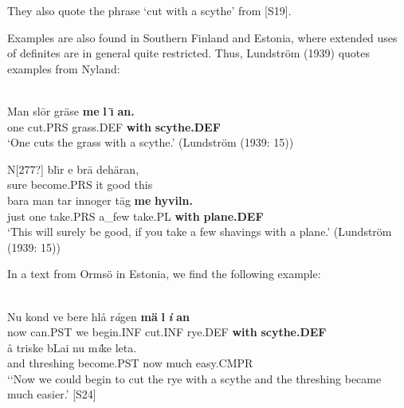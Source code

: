 They also quote the phrase  ‘cut with a scythe’ from [S19]. 


Examples are also found in Southern Finland and Estonia, where extended uses of definites are in general quite restricted. Thus, Lundström (1939) quotes examples from Nyland:


\ea\label{}
\\
\gll Man  sl\=or  gräse  \textbf{me} \textbf{l} \textbf{\={\i}} \textbf{an.}\\
one  cut.PRS  grass.DEF  \textbf{with} \textbf{scythe.DEF}\\
\glt ‘One cuts the grass with a scythe.’ (Lundström (1939: 15))

\z

\ea
\gll N[277?]  bl\={\i}r  e  br\=a  dehäran,\\
sure  become.PRS  it  good  this\\
\gll bara  man  tar  innoger  t\=ag  \textbf{me} \textbf{hyviln.}\\
just  one  take.PRS  a\_few  take.PL  \textbf{with} \textbf{plane.DEF}\\
\glt ‘This will surely be good, if you take a few shavings with a plane.’ (Lundström (1939: 15))

\z

In a text from Ormsö in Estonia, we find the following example:


\ea \label{} 
\\
\gll Nu  kond  ve  bere  hlå  r\textit{å}gen  \textbf{mä} \textbf{l} \textbf{\textit{i}} \textbf{an}\\
now  can.PST  we  begin.INF  cut.INF  rye.DEF  \textbf{with} \textbf{scythe.DEF}\\
\gll å  triske  bLai  nu  m\textit{i}ke  leta.\\
and  threshing  become.PST  now  much   easy.CMPR\\
\glt ‘‘Now we could begin to cut the rye with a scythe and the threshing became much easier.’ [S24]

